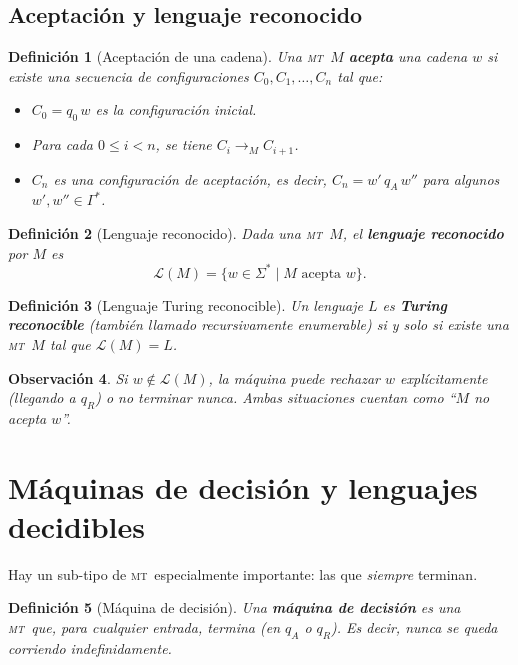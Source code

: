 \documentclass[11pt,a4paper]{article}
\theoremstyle{definicion}
\newtheorem{definicion}{Definición}[section]
\newtheorem{observacion}[definicion]{Observación}
\newcommand{\MT}{\textsc{mt}}
\begin{document}
\subsection{Aceptación y lenguaje reconocido}

\begin{definicion}[Aceptación de una cadena]
Una \MT\ $M$ \textbf{acepta} una cadena $w$ si existe una secuencia de configuraciones $C_0, C_1, \dots, C_n$ tal que:
\begin{itemize}
    \item $C_0 = q_0\, w$ es la configuración inicial.
    \item Para cada $0 \leq i < n$, se tiene $C_i \to_M C_{i+1}$.
    \item $C_n$ es una configuración de aceptación, es decir, $C_n = w'\, q_A\, w''$ para algunos $w', w'' \in \Gamma^*$.
\end{itemize}
\end{definicion}

\begin{definicion}[Lenguaje reconocido]
Dada una \MT\ $M$, el \textbf{lenguaje reconocido} por $M$ es
\[
\mathcal{L}(M) = \{ w \in \Sigma^* \mid M \text{ acepta } w \}.
\]
\end{definicion}

\begin{definicion}[Lenguaje Turing reconocible]
Un lenguaje $L$ es \textbf{Turing reconocible} (también llamado \emph{recursivamente enumerable}) si y solo si existe una \MT\ $M$ tal que $\mathcal{L}(M) = L$.
\end{definicion}

\begin{observacion}
Si $w \notin \mathcal{L}(M)$, la máquina puede rechazar $w$ explícitamente (llegando a $q_R$) \emph{o} no terminar nunca. Ambas situaciones cuentan como ``$M$ no acepta $w$''.
\end{observacion}

\section{Máquinas de decisión y lenguajes decidibles}

Hay un sub-tipo de \MT\ especialmente importante: las que \emph{siempre} terminan.

\begin{definicion}[Máquina de decisión]
Una \textbf{máquina de decisión} es una \MT\ que, para cualquier entrada, termina (en $q_A$ o $q_R$). Es decir, nunca se queda corriendo indefinidamente.
\end{definicion}
\end{document}

